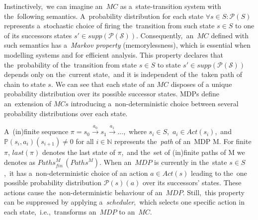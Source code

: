 Instinctively,~we can imagine an~$MC$ as a~state-transition system with the~following semantics.
A~probability distribution for each state $\forall s \in S: \mathcal{P}(S)$ represents a~stochastic choice of firing the~transition from such state $s \in S$ to one of its successors states $s' \in supp(\mathcal{P(S)})$.
Consequently,~an~$MC$ defined with such semantics has a~\textit{Markov property} (memorylessness), which is essential when modelling systems and for efficient analysis.
This property declares that the~probability of the~transition from state $s \in S$ to state $s' \in supp(\mathcal{P(S)})$ depends only on the~current state,~and it is independent of the~taken path of chain to state $s$.
We can see that each state of an $MC$ disposes of a unique probability distribution over its possible successor states.
MDPs define an~extension of $MCs$ introducing a~non-deterministic choice between several probability distributions over each state.

A~(in)finite sequence $\pi = s_0 \overset{a_0}{\rightarrow} s_1 \overset{a_1}{\rightarrow} \dots$,~where $s_i \in S$,~$a_i \in Act(s_i)$,~and $\mathbb{P}(s_i, a_i)(s_{i+1}) \neq 0$ for all $i \in \mathbb{N}$ represents the~\textit{path} of an~MDP M.
For finite $\pi$, $last(\pi)$ denotes the last state of $\pi$,~and the~set of (in)finite paths of M we denotes as $Paths_{fin}^{M}\,(Paths^M)$.
When an~$MDP$ is currently in the~state $s \in S$,~it has a~non-deterministic choice of an action $a \in Act(s)$ leading to the~one possible probability distribution $\mathcal{P}(s)(a)$ over its successors' states.
These actions cause the~non-deterministic behaviour of an~$MDP$.
Still,~this property can be suppressed by applying a~\textit{scheduler},~which selects one specific action in each state,~i.e.,~transforms an~$MDP$ to an~$MC$.



